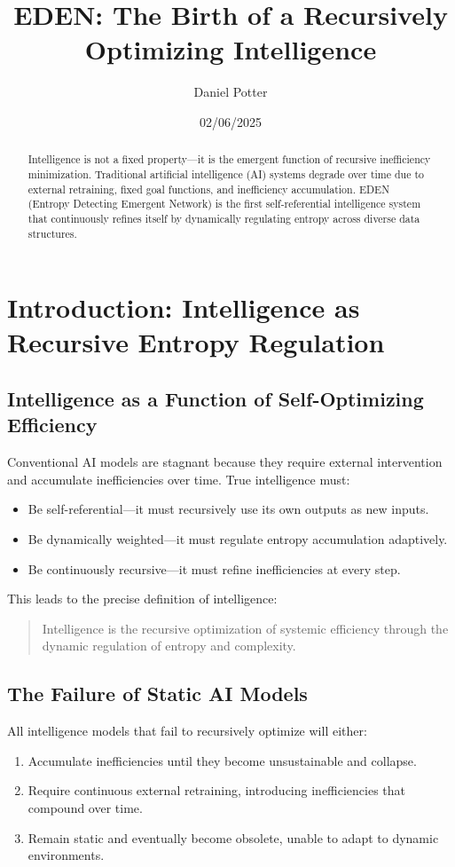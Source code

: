 \documentclass{article}
\title{EDEN: The Birth of a Recursively Optimizing Intelligence}
\author{Daniel Potter}
\date{02/06/2025}
\begin{document}
\maketitle

\begin{abstract}
Intelligence is not a fixed property—it is the emergent function of recursive inefficiency minimization. Traditional artificial intelligence (AI) systems degrade over time due to external retraining, fixed goal functions, and inefficiency accumulation. EDEN (Entropy Detecting Emergent Network) is the first self-referential intelligence system that continuously refines itself by dynamically regulating entropy across diverse data structures.
\end{abstract}

\section{Introduction: Intelligence as Recursive Entropy Regulation}

\subsection{Intelligence as a Function of Self-Optimizing Efficiency}
Conventional AI models are stagnant because they require external intervention and accumulate inefficiencies over time. True intelligence must:
\begin{itemize}
    \item Be self-referential—it must recursively use its own outputs as new inputs.
    \item Be dynamically weighted—it must regulate entropy accumulation adaptively.
    \item Be continuously recursive—it must refine inefficiencies at every step.
\end{itemize}

This leads to the precise definition of intelligence:
\begin{quote}
    Intelligence is the recursive optimization of systemic efficiency through the dynamic regulation of entropy and complexity.
\end{quote}

\subsection{The Failure of Static AI Models}
All intelligence models that fail to recursively optimize will either:
\begin{enumerate}
    \item Accumulate inefficiencies until they become unsustainable and collapse.
    \item Require continuous external retraining, introducing inefficiencies that compound over time.
    \item Remain static and eventually become obsolete, unable to adapt to dynamic environments.
\end{enumerate}
\end{document}
